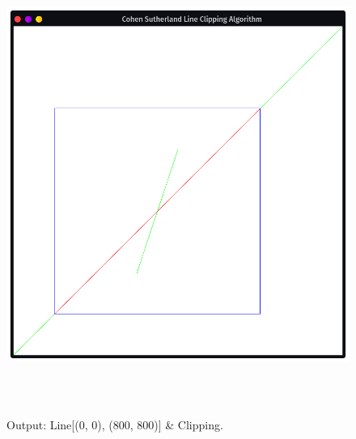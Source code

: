 \documentclass[12pt, a4]{article}
\begin{document}
\subsection*{}
\begin{figure}[h]
\centering
\caption{Output: Line[(0, 0), (800, 800)] \& Clipping.}
\includegraphics[height=15cm, width=15cm]{Outputs/Output-3.png}
\end{figure}

\newpage
\end{document}

